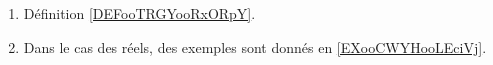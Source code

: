 
    \begin{enumerate}
        \item
            Définition \ref{DEFooTRGYooRxORpY}.
        \item
            Dans le cas des réels, des exemples sont donnés en \ref{EXooCWYHooLEciVj}.
        \end{enumerate}

